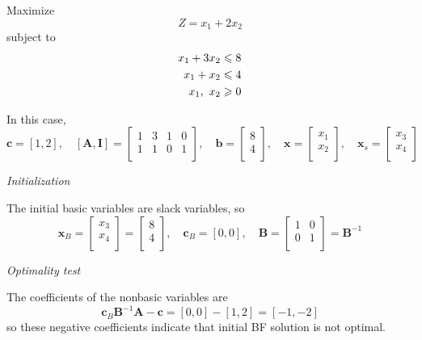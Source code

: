\documentclass[a4paper]{article}
\begin{document}
\begin{enumerate}
Maximize $$Z=x_1+2x_2$$
subject to
\begin{equation*}
\begin{aligned}
x_1+3x_2&\leqslant 8\\
x_1+x_2&\leqslant 4\\
x_1,\ x_2&\geqslant 0\\
\end{aligned}
\end{equation*}

\begin{solution}
	
	In this case, $$ \mathbf{c}=[1,2],\quad [\mathbf{A},\mathbf{I}]=\begin{bmatrix}
	1&3&1&0\\
	1&1&0&1\\
	\end{bmatrix},\quad
	\mathbf{b}=\begin{bmatrix}
	8\\
	4\\
	\end{bmatrix},\quad
		\mathbf{x}=\begin{bmatrix}
	x_1\\
	x_2\\
	\end{bmatrix},\quad
	\mathbf{x}_s=\begin{bmatrix}
	x_3\\
	x_4\\
	\end{bmatrix}$$
	
	\textit{Initialization}
	
	The initial basic variables are slack variables, so
	\begin{equation*}
	\mathbf{x}_B=\begin{bmatrix}
	x_3\\
	x_4\\
	\end{bmatrix}
	=\begin{bmatrix}
	8\\
	4\\
	\end{bmatrix},\quad
	\mathbf{c}_B=[0,0],\quad
	\mathbf{B}=\begin{bmatrix}
	1&0\\
	0&1\\
	\end{bmatrix}=\mathbf{B}^{-1}
	\end{equation*}
	
	\textit{Optimality test}
	
	The coefficients of the nonbasic variables are
	\begin{equation*}
	\mathbf{c}_B\mathbf{B}^{-1}\mathbf{A}-\mathbf{c}=[0,0]-[1,2]=[-1,-2]
	\end{equation*}
	so these negative coefficients indicate that initial BF solution is not optimal.
	

\end{solution}
\end{enumerate}
\end{document}
